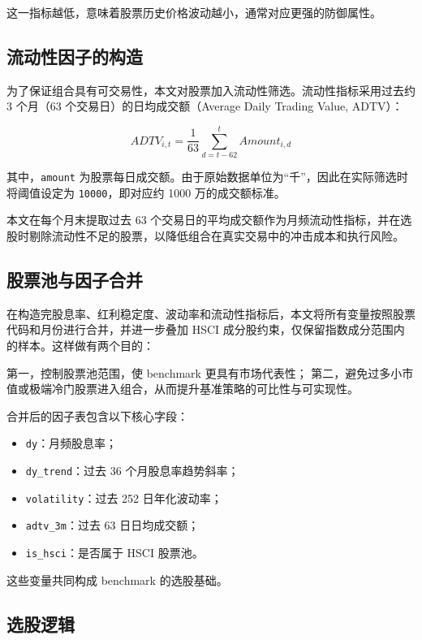 \documentclass[a4paper,10pt]{article}
\begin{document}
这一指标越低，意味着股票历史价格波动越小，通常对应更强的防御属性。

\subsection{流动性因子的构造}

为了保证组合具有可交易性，本文对股票加入流动性筛选。流动性指标采用过去约 3 个月（63 个交易日）的日均成交额（Average Daily Trading Value, ADTV）：

\begin{equation}
ADTV_{i,t} = \frac{1}{63}\sum_{d=t-62}^{t} Amount_{i,d}
\end{equation}

其中，\texttt{amount} 为股票每日成交额。由于原始数据单位为“千”，因此在实际筛选时将阈值设定为 \texttt{10000}，即对应约 1000 万的成交额标准。

本文在每个月末提取过去 63 个交易日的平均成交额作为月频流动性指标，并在选股时剔除流动性不足的股票，以降低组合在真实交易中的冲击成本和执行风险。

\subsection{股票池与因子合并}

在构造完股息率、红利稳定度、波动率和流动性指标后，本文将所有变量按照股票代码和月份进行合并，并进一步叠加 HSCI 成分股约束，仅保留指数成分范围内的样本。这样做有两个目的：

第一，控制股票池范围，使 benchmark 更具有市场代表性；  
第二，避免过多小市值或极端冷门股票进入组合，从而提升基准策略的可比性与可实现性。

合并后的因子表包含以下核心字段：

\begin{itemize}
    \item \texttt{dy}：月频股息率；
    \item \texttt{dy\_trend}：过去 36 个月股息率趋势斜率；
    \item \texttt{volatility}：过去 252 日年化波动率；
    \item \texttt{adtv\_3m}：过去 63 日日均成交额；
    \item \texttt{is\_hsci}：是否属于 HSCI 股票池。
\end{itemize}

这些变量共同构成 benchmark 的选股基础。

\subsection{选股逻辑}
\end{document}
